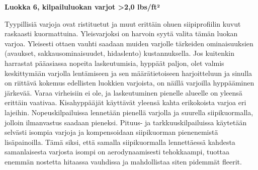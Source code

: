 \textbf{Luokka 6, kilpailuluokan varjot >2,0 lbs/ft²} 


Tyypillisiä varjoja ovat ristituetut ja muut erittäin ohuen siipiprofiilin kuvut raskaasti kuormattuina. Yleisvarjoksi on harvoin syytä valita tämän luokan varjoa. Yleisesti ottaen vauhti saadaan muiden varjolle tärkeiden ominaisuuksien (avaukset, sakkausominaisuudet, hidaslento) kustannuksella. Jos kuitenkin harrastat pääasiassa nopeita laskeutumisia, hyppäät paljon, olet valmis keskittymään varjolla lentämiseen ja sen määrätietoiseen harjoitteluun ja sinulla on riittävä kokemus edellisten luokkien varjoista, on näillä varjoilla hyppääminen järkevää. Varaa virheisiin ei ole, ja laskeutuminen pienelle alueelle on yleensä erittäin vaativaa. Kisahyppääjät käyttävät yleensä kahta erikokoista varjoa eri lajeihin. Nopeuskilpailuissa lennetään pienellä varjolla ja suurella siipikuormalla, jolloin ilmanvastus saadaan pieneksi. Pituus- ja tarkkuuskilpailuissa käytetään selvästi isompia varjoja ja kompensoidaan siipikuorman pienenemistä lisäpainoilla. Tämä siksi, että samalla siipikuormalla lennettäessä kahdesta samanlaisesta varjosta isompi on aerodynaamisesti tehokkaampi, tuottaa enemmän nostetta hitaassa vauhdissa ja mahdollistaa siten pidemmät fleerit. 

